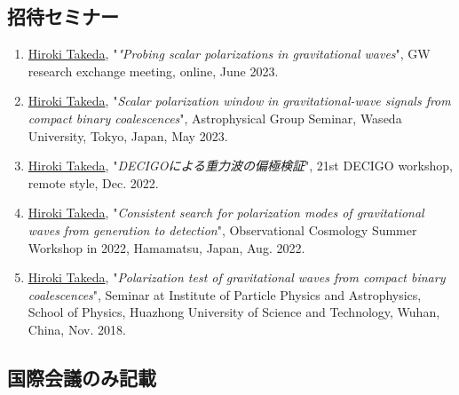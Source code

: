 \documentclass[uplatex, 11pt]{jsarticle}
\begin{document}
\subsection*{招待セミナー}
\begin{enumerate}
\item \uline{Hiroki Takeda}, "\emph{"Probing scalar polarizations in gravitational waves}", GW research exchange meeting, online, June 2023.\\

\item \uline{Hiroki Takeda}, "\emph{Scalar polarization window in gravitational-wave signals from compact binary coalescences}",
Astrophysical Group Seminar, Waseda University, Tokyo, Japan, May 2023.\\

\item \uline{Hiroki Takeda}, "\emph{DECIGOによる重力波の偏極検証}", 21st DECIGO workshop, remote style, Dec. 2022.\\

\item \uline{Hiroki Takeda}, "\emph{Consistent search for polarization modes of gravitational waves from generation to detection}", Observational Cosmology Summer Workshop in 2022,  Hamamatsu, Japan, Aug. 2022.\\

\item \uline{Hiroki Takeda}, "\emph{Polarization test of gravitational waves from compact binary coalescences}", Seminar at Institute of Particle Physics and Astrophysics, School of Physics, Huazhong University of Science and Technology, Wuhan, China, Nov. 2018.\\
\end{enumerate}

\subsection*{国際会議のみ記載}
\end{document}
